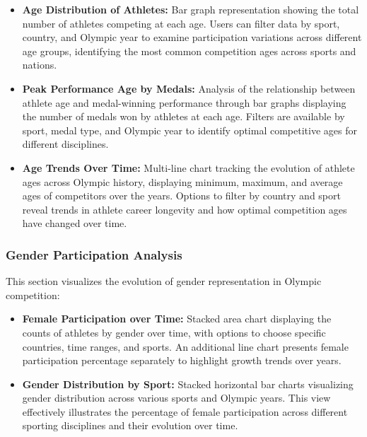 \documentclass[a4paper, 12pt]{article}
\begin{document}
\begin{itemize}[leftmargin=*]
    \item \textbf{Age Distribution of Athletes:} Bar graph representation showing the total number of athletes competing at each age. Users can filter data by sport, country, and Olympic year to examine participation variations across different age groups, identifying the most common competition ages across sports and nations.
    
    \item \textbf{Peak Performance Age by Medals:} Analysis of the relationship between athlete age and medal-winning performance through bar graphs displaying the number of medals won by athletes at each age. Filters are available by sport, medal type, and Olympic year to identify optimal competitive ages for different disciplines.
    
    \item \textbf{Age Trends Over Time:} Multi-line chart tracking the evolution of athlete ages across Olympic history, displaying minimum, maximum, and average ages of competitors over the years. Options to filter by country and sport reveal trends in athlete career longevity and how optimal competition ages have changed over time.
\end{itemize}

\subsubsection{Gender Participation Analysis}
This section visualizes the evolution of gender representation in Olympic competition:

\begin{itemize}[leftmargin=*]
    \item \textbf{Female Participation over Time:} Stacked area chart displaying the counts of athletes by gender over time, with options to choose specific countries, time ranges, and sports. An additional line chart presents female participation percentage separately to highlight growth trends over years.
    
    \item \textbf{Gender Distribution by Sport:} Stacked horizontal bar charts visualizing gender distribution across various sports and Olympic years. This view effectively illustrates the percentage of female participation across different sporting disciplines and their evolution over time.
\end{itemize}
\end{document}
